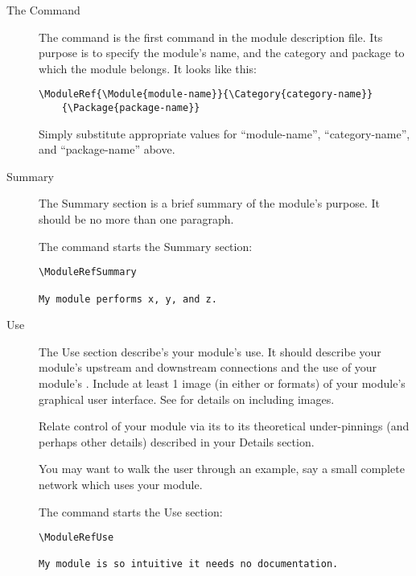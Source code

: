 \documentclass[11pt]{article}
\begin{document}
\begin{description}
\item[The  Command]\mbox{}

  The  command is the first command in the
  module description file.  Its purpose is to specify the module's
  name, and the category and package to which the module belongs.  It
  looks like this:

\begin{verbatim}
\ModuleRef{\Module{module-name}}{\Category{category-name}}
    {\Package{package-name}}
\end{verbatim}
  
  Simply substitute appropriate values for ``module-name'',
  ``category-name'', and ``package-name'' above.

\item[Summary]
  \label{sec:summary} \mbox{}

  The Summary section is a brief summary of the module's purpose.  It
  should be no more than one paragraph.

  The  command starts the Summary section:

\begin{verbatim}
\ModuleRefSummary

My module performs x, y, and z.     
\end{verbatim}

\item[Use] \label{sec:use} \mbox{}
  
  The Use section describe's your module's use.  It should describe your
  module's upstream and downstream connections and the use of your module's
  \gui{}.  Include at least 1 image (in either  or
   formats) of your module's graphical user
  interface.  See  for details on
  including images.
  
  Relate control of your module via its \gui{} to its theoretical
  under-pinnings (and perhaps other details) described in your
  Details section.
  
  You may want to walk the user through an example, say a small
  complete network which uses your module.

  The  command starts the Use section:
  
\begin{verbatim}
\ModuleRefUse

My module is so intuitive it needs no documentation.
\end{verbatim}


\end{description}
\end{document}
